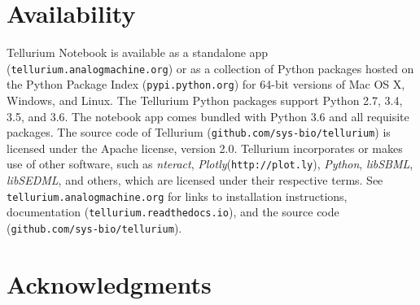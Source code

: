 \documentclass[10pt,letterpaper]{article}
\begin{document}




\section*{Availability}

Tellurium Notebook is available as a standalone app (\texttt{tellurium.analogmachine.org}) or as a collection of Python packages hosted on the Python Package Index (\texttt{pypi.python.org}) for 64-bit versions of Mac OS X, Windows, and Linux. The Tellurium Python packages support Python 2.7, 3.4, 3.5, and 3.6. The notebook app comes bundled with Python 3.6 and all requisite packages. The source code of Tellurium (\texttt{github.com/sys-bio/tellurium}) is licensed under the Apache license, version 2.0. Tellurium incorporates or makes use of other software, such as \textit{nteract}, \textit{Plotly}(\texttt{http://plot.ly}), \textit{Python}, \textit{libSBML}, \textit{libSEDML}, and others, which are licensed under their respective terms. See \texttt{tellurium.analogmachine.org} for links to installation instructions, documentation (\texttt{tellurium.readthedocs.io}), and the source code (\texttt{github.com/sys-bio/tellurium}).

\section*{Acknowledgments}
\end{document}
